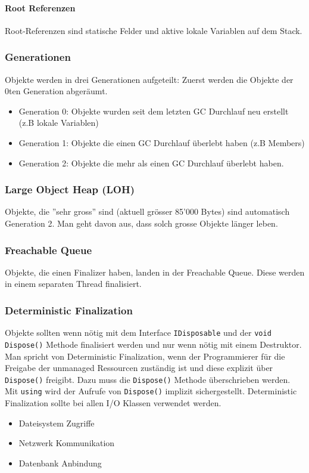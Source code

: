 \documentclass[
a4paper,
oneside,
10pt,
fleqn,
headsepline,
toc=listofnumbered, 
bibliography=totocnumbered]{scrartcl}
\begin{document}
\paragraph{Root Referenzen}
Root-Referenzen sind statische Felder und aktive lokale Variablen auf dem Stack.

\subsubsection{Generationen}
Objekte werden in drei Generationen aufgeteilt: Zuerst werden die Objekte der 0ten Generation abgeräumt.
\begin{itemize}
	\item Generation 0: Objekte wurden seit dem letzten GC Durchlauf neu erstellt (z.B lokale Variablen)
	\item Generation 1: Objekte die einen GC Durchlauf überlebt haben (z.B Members)
	\item Generation 2: Objekte die mehr als einen GC Durchlauf überlebt haben.
\end{itemize}

\subsubsection{Large Object Heap (LOH)}
Objekte, die ''sehr gross'' sind (aktuell grösser 85'000 Bytes) sind automatisch Generation 2. Man geht davon aus, dass solch grosse Objekte länger leben.

\subsubsection{Freachable Queue}
Objekte, die einen Finalizer haben, landen in der Freachable Queue. Diese werden in einem separaten Thread finalisiert.

\subsubsection{Deterministic Finalization} Objekte sollten wenn nötig mit dem Interface \lstinline|IDisposable| und der \lstinline|void Dispose()| Methode finalisiert werden und nur wenn nötig mit einem Destruktor. Man spricht von Deterministic Finalization, wenn der Programmierer für die Freigabe der unmanaged Ressourcen zuständig ist und diese explizit über \lstinline|Dispose()| freigibt. Dazu muss die \lstinline|Dispose()| Methode überschrieben werden. Mit \lstinline|using| wird der Aufrufe von \lstinline|Dispose()| implizit sichergestellt. Deterministic Finalization sollte bei allen I/O Klassen verwendet werden.
\begin{itemize}
	\item Dateisystem Zugriffe
	\item Netzwerk Kommunikation
	\item Datenbank Anbindung
\end{itemize}
\end{document}
